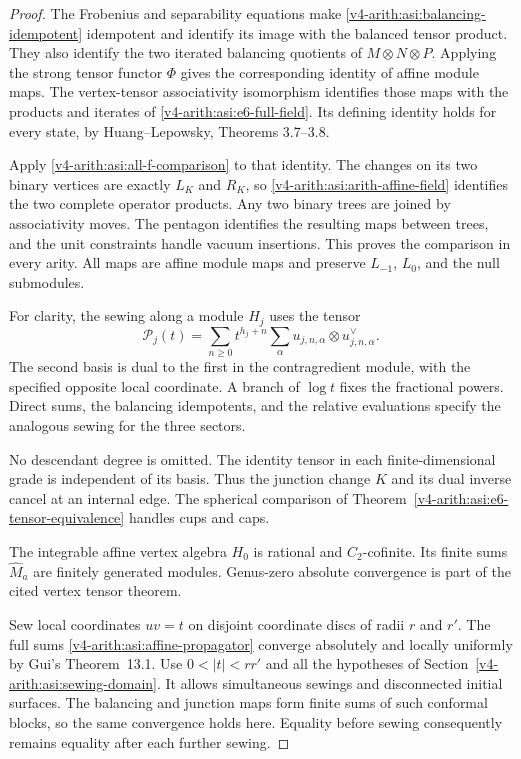 \begin{proof}
The Frobenius and separability equations make
\eqref{v4-arith:asi:balancing-idempotent} idempotent and identify its image
with the balanced tensor product. They also identify the two iterated
balancing quotients of $M\otimes N\otimes P$. Applying the strong
tensor functor $\Phi$ gives the corresponding identity of affine module
maps. The vertex-tensor associativity isomorphism identifies those
maps with the products and iterates of
\eqref{v4-arith:asi:e6-full-field}. Its defining identity holds for every
state, by Huang--Lepowsky, Theorems 3.7--3.8.

Apply \eqref{v4-arith:asi:all-f-comparison} to that identity. The changes
on its two binary vertices are exactly $L_K$ and $R_K$, so
\eqref{v4-arith:asi:arith-affine-field} identifies the two complete
operator products. Any two binary trees are joined by associativity
moves. The pentagon identifies the resulting maps between trees,
and the unit constraints handle vacuum insertions. This proves the
comparison in every arity. All maps are affine module maps and
preserve $L_{-1}$, $L_0$, and the null submodules.

For clarity, the sewing along a module $H_j$ uses the tensor
\begin{equation}\label{v4-arith:asi:affine-propagator}
 \mathcal P_j(t)=\sum_{n\geq0}t^{h_j+n}
       \sum_\alpha u_{j,n,\alpha}\otimes u^{\vee}_{j,n,\alpha}.
\end{equation}
The second basis is dual to the first in the contragredient module,
with the specified opposite local coordinate. A branch of $\log t$
fixes the fractional powers. Direct sums, the balancing idempotents,
and the relative evaluations specify the analogous sewing for the
three sectors.

No descendant degree is omitted. The identity tensor
in each finite-dimensional grade is independent of its basis.
Thus the junction change $K$ and its dual inverse cancel at an internal edge.
The spherical comparison of
Theorem~\ref{v4-arith:asi:e6-tensor-equivalence} handles cups and caps.

The integrable affine vertex algebra $H_0$ is rational and
$C_2$-cofinite. Its finite sums $\widehat M_a$ are finitely generated
modules. Genus-zero absolute convergence is part of the cited vertex
tensor theorem.

Sew local coordinates $uv=t$ on disjoint
coordinate discs of radii $r$ and $r'$.
The full sums \eqref{v4-arith:asi:affine-propagator} converge
absolutely and locally uniformly by Gui's Theorem~13.1.
Use \(0<|t|<rr'\) and all the hypotheses of
Section~\ref{v4-arith:asi:sewing-domain}. It allows simultaneous
sewings and disconnected initial surfaces. The balancing and junction
maps form finite sums of such conformal blocks, so the same convergence
holds here. Equality before sewing consequently remains equality after
each further sewing.
\end{proof}

